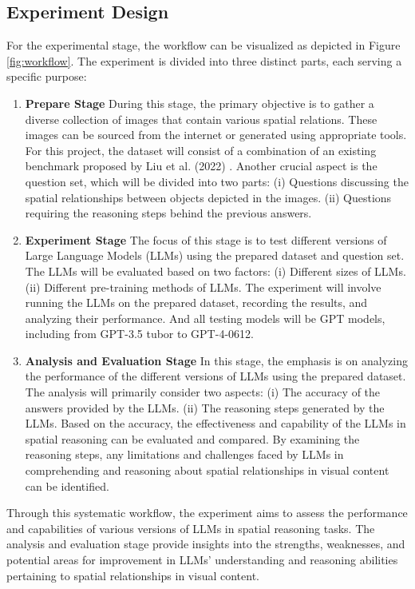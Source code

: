 \documentclass[journal,10pt]{IEEEtran}
\begin{document}
\subsection{Experiment Design}
For the experimental stage, the workflow can be visualized as depicted in Figure \ref{fig:workflow}. The experiment is divided into three distinct parts, each serving a specific purpose:
\begin{enumerate}
    \item \textbf{Prepare Stage}
    \subitem During this stage, the primary objective is to gather a diverse collection of images that contain various spatial relations. These images can be sourced from the internet or generated using appropriate tools. For this project, the dataset will consist of a combination of an existing benchmark proposed by Liu et al. (2022) \cite{liu2022visual}.
    Another crucial aspect is the question set, which will be divided into two parts:
    (i) Questions discussing the spatial relationships between objects depicted in the images.
    (ii) Questions requiring the reasoning steps behind the previous answers.
    \item \textbf{Experiment Stage}
    \subitem The focus of this stage is to test different versions of Large Language Models (LLMs) using the prepared dataset and question set. The LLMs will be evaluated based on two factors:
    (i) Different sizes of LLMs.
    (ii) Different pre-training methods of LLMs.
    The experiment will involve running the LLMs on the prepared dataset, recording the results, and analyzing their performance. And all testing models will be GPT models, including from GPT-3.5 tubor to GPT-4-0612.
    \item \textbf{Analysis and Evaluation Stage}
    \subitem In this stage, the emphasis is on analyzing the performance of the different versions of LLMs using the prepared dataset. The analysis will primarily consider two aspects:
    (i) The accuracy of the answers provided by the LLMs.
    (ii) The reasoning steps generated by the LLMs.
    Based on the accuracy, the effectiveness and capability of the LLMs in spatial reasoning can be evaluated and compared. By examining the reasoning steps, any limitations and challenges faced by LLMs in comprehending and reasoning about spatial relationships in visual content can be identified.
\end{enumerate}

Through this systematic workflow, the experiment aims to assess the performance and capabilities of various versions of LLMs in spatial reasoning tasks. The analysis and evaluation stage provide insights into the strengths, weaknesses, and potential areas for improvement in LLMs' understanding and reasoning abilities pertaining to spatial relationships in visual content.
\end{document}
